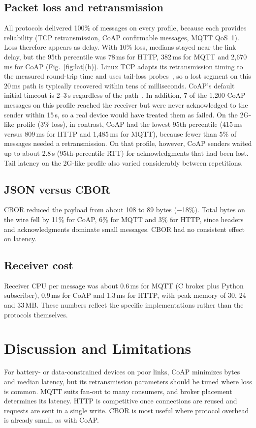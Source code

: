 \documentclass[conference]{IEEEtran}
\begin{document}
\subsection{Packet loss and retransmission}
All protocols delivered 100\% of messages on every profile, because each provides reliability (TCP retransmission, CoAP confirmable messages, MQTT QoS~1). Loss therefore appears as delay. With 10\% loss, medians stayed near the link delay, but the 95th percentile was 78\,ms for HTTP, 382\,ms for MQTT and 2{,}670\,ms for CoAP (Fig.~\ref{fig:lat}(b)). Linux TCP adapts its retransmission timing to the measured round-trip time and uses tail-loss probes~\cite{rfc6298,rfc8985}, so a lost segment on this 20\,ms path is typically recovered within tens of milliseconds. CoAP's default initial timeout is 2--3\,s regardless of the path~\cite{rfc7252}. In addition, 7 of the 1,200 CoAP messages on this profile reached the receiver but were never acknowledged to the sender within 15\,s, so a real device would have treated them as failed. On the 2G-like profile (3\% loss), in contrast, CoAP had the lowest 95th percentile (415\,ms versus 809\,ms for HTTP and 1,485\,ms for MQTT), because fewer than 5\% of messages needed a retransmission. On that profile, however, CoAP senders waited up to about 2.8\,s (95th-percentile RTT) for acknowledgments that had been lost. Tail latency on the 2G-like profile also varied considerably between repetitions.

\subsection{JSON versus CBOR}
CBOR reduced the payload from about 108 to 89 bytes ($-$18\%). Total bytes on the wire fell by 11\% for CoAP, 6\% for MQTT and 3\% for HTTP, since headers and acknowledgments dominate small messages. CBOR had no consistent effect on latency.

\subsection{Receiver cost}
Receiver CPU per message was about 0.6\,ms for MQTT (C broker plus Python subscriber), 0.9\,ms for CoAP and 1.3\,ms for HTTP, with peak memory of 30, 24 and 33\,MB. These numbers reflect the specific implementations rather than the protocols themselves.

\section{Discussion and Limitations}
For battery- or data-constrained devices on poor links, CoAP minimizes bytes and median latency, but its retransmission parameters should be tuned where loss is common. MQTT suits fan-out to many consumers, and broker placement determines its latency. HTTP is competitive once connections are reused and requests are sent in a single write. CBOR is most useful where protocol overhead is already small, as with CoAP.
\end{document}
